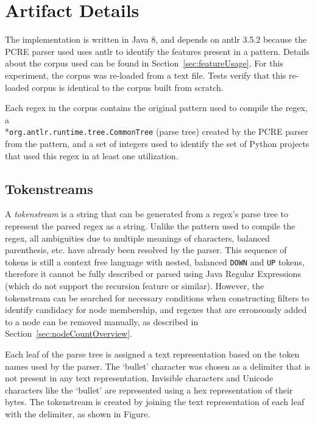 \section*{Artifact Details}
\label{app:nodeCountImplementation}
The implementation is written in Java 8, and depends on antlr 3.5.2 because the PCRE parser used uses antlr to identify the features present in a pattern.  Details about the corpus used can be found in Section~\ref{sec:featureUsage}.  For this experiment, the corpus was re-loaded from a text file.  Tests verify that this re-loaded corpus is identical to the corpus built from scratch.

Each regex in the corpus contains the original pattern used to compile the regex, a
\\*{\tt org.antlr.runtime.tree.CommonTree} (parse tree) created by the PCRE parser from the pattern, and a set of integers used to identify the set of Python projects that used this regex in at least one utilization.

\subsection*{Tokenstreams}
A \emph{tokenstream} is a string that can be generated from a regex's parse tree to represent the parsed regex as a string. Unlike the pattern used to compile the regex, all ambiguities due to multiple meanings of characters, balanced parenthesis, etc. have already been resolved by the parser. This sequence of tokens is still a context free language with nested, balanced \verb!DOWN! and \verb!UP! tokens, therefore it cannot be fully described or parsed using Java Regular Expressions (which do not support the recursion feature or similar).  However, the tokenstream can be searched for necessary conditions when constructing filters to identify candidacy for node membership, and regexes that are erroneously added to a node can be removed manually, as described in Section~\ref{sec:nodeCountOverview}.

Each leaf of the parse tree is assigned a text representation based on the token names used by the parser.  The `bullet' character was chosen as a delimiter that is not present in any text representation.  Invisible characters and Unicode characters like the `bullet' are represented using a hex representation of their bytes.  The tokenstream is created by joining the text representation of each leaf with the delimiter, as shown in Figure.


